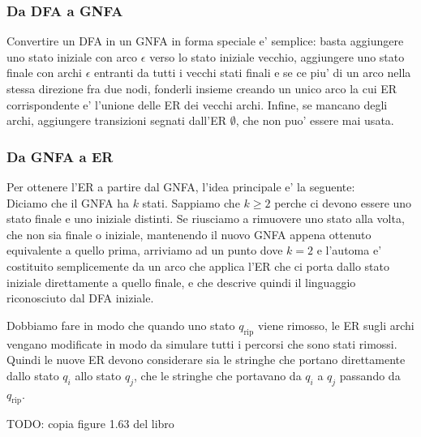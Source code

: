 \subsubsection{Da DFA a GNFA}
Convertire un DFA in un GNFA in forma speciale e' semplice: basta aggiungere uno stato iniziale con arco $ \epsilon $ verso lo stato iniziale vecchio, aggiungere uno stato finale con archi $ \epsilon $ entranti da tutti i vecchi stati finali e se ce piu' di un arco nella stessa direzione fra due nodi, fonderli insieme creando un unico arco la cui ER corrispondente e' l'unione delle ER dei vecchi archi. Infine, se mancano degli archi, aggiungere transizioni segnati dall'ER $ \emptyset $, che non puo' essere mai usata. 

\subsubsection{Da GNFA a ER}
Per ottenere l'ER a partire dal GNFA, l'idea principale e' la seguente:\\
Diciamo che il GNFA ha $ k $ stati. Sappiamo che $ k \geq 2 $ perche ci devono essere uno stato finale e uno iniziale distinti. Se riusciamo a rimuovere uno stato alla volta, che non sia finale o iniziale, mantenendo il nuovo GNFA appena ottenuto equivalente a quello prima, arriviamo ad un punto dove $ k=2 $ e l'automa e' costituito semplicemente da un arco che applica l'ER che ci porta dallo stato iniziale direttamente a quello finale, e che descrive quindi il linguaggio riconosciuto dal DFA iniziale.

Dobbiamo fare in modo che quando uno stato $ q_{\text{rip}} $ viene rimosso, le ER sugli archi vengano modificate in modo da simulare tutti i percorsi che sono stati rimossi. Quindi le nuove ER devono considerare sia le stringhe che portano direttamente dallo stato $ q_i $ allo stato $ q_j $, che le stringhe che portavano da $ q_i $ a $ q_j $ passando da $ q_{\text{rip}} $.

TODO: copia figure 1.63 del libro

